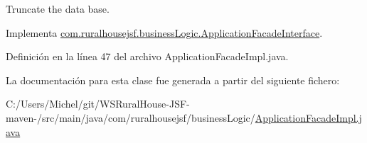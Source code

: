 Truncate the data base. 

Implementa \mbox{\hyperlink{interfacecom_1_1ruralhousejsf_1_1business_logic_1_1_application_facade_interface_aeb85aa3c5dd08bc15e08cc0d4c36882e}{com.\+ruralhousejsf.\+business\+Logic.\+Application\+Facade\+Interface}}.



Definición en la línea 47 del archivo Application\+Facade\+Impl.\+java.



La documentación para esta clase fue generada a partir del siguiente fichero\+:\begin{DoxyCompactItemize}
\item 
C\+:/\+Users/\+Michel/git/\+W\+S\+Rural\+House-\/\+J\+S\+F-\/maven-\//src/main/java/com/ruralhousejsf/business\+Logic/\mbox{\hyperlink{_application_facade_impl_8java}{Application\+Facade\+Impl.\+java}}\end{DoxyCompactItemize}
